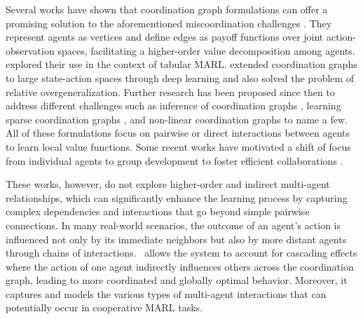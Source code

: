 Several works have shown that coordination graph formulations can offer a promising solution to the aforementioned miscoordination challenges \cite{guestrin2002coordinated,guestrin2001multiagent,kok2006collaborative,rogers2011bounded}. They represent agents as vertices and define edges as payoff functions over joint action-observation spaces, facilitating a higher-order value decomposition among agents. \cite{kok2004sparse} explored their use in the context of tabular MARL. \cite{bohmer2020deep} extended coordination graphs to large state-action spaces through deep learning and also solved the problem of relative overgeneralization. Further research has been proposed since then to address different challenges such as inference of coordination graphs \cite{li2021deep}, learning sparse coordination graphs \cite{wang2022contextaware,castellini2021analysing}, and non-linear coordination graphs \cite{kang2022non} to name a few. All of these formulations focus on pairwise or direct interactions between agents to learn local value functions. Some recent works have motivated a shift of focus from individual agents to group development to foster efficient collaborations \cite{phan2021vast,shao2022self,duan2024group,zang2024automatic}. 

These works, however, do not explore higher-order and indirect multi-agent relationships, which can significantly enhance the learning process by capturing complex dependencies and interactions that go beyond simple pairwise connections.  In many real-world scenarios, the outcome of an agent’s action is influenced not only by its immediate neighbors but also by more distant agents through chains of interactions. \algoabb\ allows the system to account for cascading effects where the action of one agent indirectly influences others across the coordination graph, leading to more coordinated and globally optimal behavior. Moreover, it captures and models the various types of multi-agent interactions that can potentially occur in cooperative MARL tasks. 

